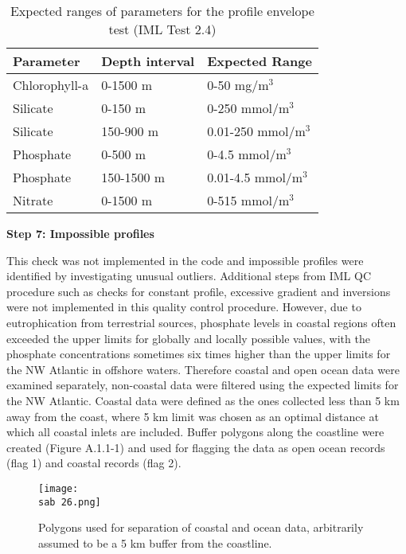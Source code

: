 \documentclass[letterpaper,portrait,11pt]{scrartcl}
\numberwithin{equation}{section}		%
\numberwithin{figure}{section}			%
\numberwithin{table}{section}				%
\newcommand{\ecomod}{\string~/ecomod_data/}   %
\newcommand{\sab}{\ecomod/mpa/sab/}   %
\begin{document}
\begin{itemize*}
\begin{appendices}
\begin{table}[h]
\label{tableBioChemQC}
\caption{Expected ranges of parameters for the profile envelope test (IML Test 2.4)}
\begin{tabular}{lll}
Parameter & Depth interval & Expected Range \\
\hline
Chlorophyll-a & 0-1500 m & 0-50 mg/m$^{3}$ \\
Silicate & 0-150 m & 0-250 mmol/m$^{3}$ \\
Silicate & 150-900 m & 0.01-250 mmol/m$^{3}$ \\
Phosphate & 0-500 m & 0-4.5 mmol/m$^{3}$ \\
Phosphate & 150-1500 m & 0.01-4.5 mmol/m$^{3}$ \\
Nitrate & 0-1500 m & 0-515 mmol/m$^{3}$ \\
\end{tabular}
\end{table}


\textbf{Step 7: Impossible profiles}

This check was not implemented in the code and impossible profiles were identified by investigating unusual outliers.
Additional steps from IML QC procedure such as checks for constant profile, excessive gradient and inversions were not implemented in this quality control procedure. However, due to eutrophication from terrestrial sources, phosphate levels in coastal regions often exceeded the upper limits for globally and locally possible values, with the phosphate concentrations sometimes six times higher than the upper limits for the NW Atlantic in offshore waters. Therefore coastal and open ocean data were examined separately, non-coastal data were filtered using the expected limits for the NW Atlantic. Coastal data were defined as the ones collected less than 5 km away from the coast, where 5 km limit was chosen as an optimal distance at which all coastal inlets are included. Buffer polygons along the coastline were created (Figure A.1.1-1) and used for flagging the data as open ocean records (flag 1) and coastal records (flag 2).

\begin{figure}
  \centering
  \texttt{[image: \\sab 26.png]}
  \caption{Polygons used for separation of coastal and ocean data, arbitrarily assumed to be a 5 km buffer from the coastline.}
  \label{figA.1.1-1}
\end{figure}



\end{appendices}
\end{itemize*}
\end{document}
